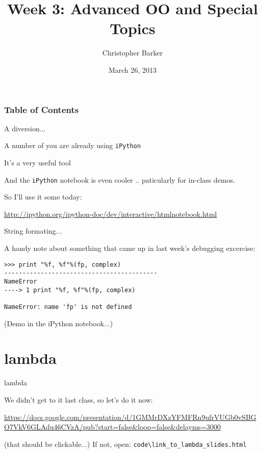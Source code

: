 \documentclass{beamer}
\title[Python Certificate: System Development]{Week 3: Advanced OO and Special Topics}
\author{Christopher Barker}
\institute{UW Continuing Education}
\date{March 26, 2013}
\begin{document}
\begin{frame}
  \titlepage
\end{frame}

\begin{frame}
\frametitle{Table of Contents}
  \tableofcontents
\end{frame}


\begin{frame}[fragile]{A diversion...}

\Large{A number of you are already using \verb|iPython|}

\vfill
\Large{It's a very useful tool}

\vfill
\Large{And the \verb|iPython| notebook is even cooler .. paticularly for in-class demos.}

\vfill
\Large{So I'll use it some today:}

\vfill
\url{http://ipython.org/ipython-doc/dev/interactive/htmlnotebook.html}


\end{frame}

\begin{frame}[fragile]{String formating...}

\Large{A handy note about something that came up in last week's debugging excercise:}

\vfill
\small{
\begin{verbatim}
>>> print "%f, %f"%(fp, complex)
------------------------------------------
NameError                                 
----> 1 print "%f, %f"%(fp, complex)

NameError: name 'fp' is not defined
\end{verbatim}
}

\vfill
\large{(Demo in the iPython notebook...)}

\end{frame}


\section{lambda}

\begin{frame}[fragile]{lambda}

\vfill
\Large{We didn't get to it last class, so let's do it now:}

\vfill
\url{https://docs.google.com/presentation/d/1GMMrDXzYFMFRn9ufrVUGb0vSBGO7VkV6GLAdu46CVzA/pub?start=false&loop=false&delayms=3000}

(that should be clickable...)
\vfill
If not, open: \verb'code\link_to_lambda_slides.html'

\end{frame}
\end{document}
